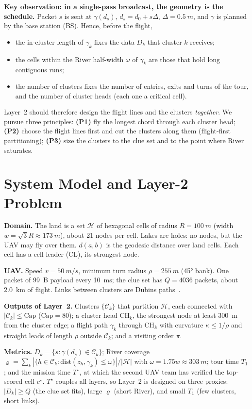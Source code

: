 \documentclass[conference]{IEEEtran}
\newcommand{\CapC}{\mathrm{Cap}}
\newcommand{\CH}{\mathrm{CH}}
\begin{document}
\textbf{Key observation: in a single-pass broadcast, the geometry is the schedule.} Packet $s$ is sent at
$\gamma(d_s)$, $d_s=d_0+s\Delta$, $\Delta=\SI{0.5}{m}$, and $\gamma$ is planned by the base station (BS). Hence,
before the flight,
\begin{itemize}
\item the in-cluster length of $\gamma_k$ fixes the data $D_k$ that cluster $k$ receives;
\item the cells within the River half-width $\omega$ of $\gamma_k$ are those that hold long contiguous runs;
\item the number of clusters fixes the number of entries, exits and turns of the tour, and the number of cluster heads
(each one a critical cell).
\end{itemize}
Layer~2 should therefore design the flight lines and the clusters \emph{together}. We pursue three principles:
\textbf{(P1)} fly the longest chord through each cluster head; \textbf{(P2)} choose the flight lines first and cut
the clusters along them (flight-first partitioning); \textbf{(P3)} size the clusters to the clue set and to the
point where River saturates.

\section{System Model and Layer-2 Problem}
\textbf{Domain.} The land is a set $\mathcal H$ of hexagonal cells of radius $R=\SI{100}{m}$ (width
$w=\sqrt3R\approx\SI{173}{m}$), about 21 nodes per cell. Lakes are holes: no nodes, but the UAV may fly over them.
$d(a,b)$ is the geodesic distance over land cells. Each cell has a cell leader (CL), its strongest node.

\textbf{UAV.} Speed $v=\SI{50}{m/s}$, minimum turn radius $\rho=\SI{255}{m}$ (\ang{45} bank). One packet of
\SI{99}{B} payload every \SI{10}{ms}; the clue set has $Q=4036$ packets, about \SI{2.0}{km} of flight. Links between
clusters are Dubins paths~\cite{dubins1957}.

\textbf{Outputs of Layer~2.} Clusters $\{\mathcal C_k\}$ that partition $\mathcal H$, each connected with
$|\mathcal C_k|\le\CapC$ ($\CapC=80$); a cluster head $\CH_k$, the strongest node at least \SI{300}{m} from the cluster
edge; a flight path $\gamma_k$ through $\CH_k$ with curvature $\kappa\le1/\rho$ and straight leads of length $\rho$
outside $\mathcal C_k$; and a visiting order $\pi$.

\textbf{Metrics.} $D_k=\{s:\gamma(d_s)\in\mathcal C_k\}$; River coverage
$\varrho=\sum_k|\{h\in\mathcal C_k:\mathrm{dist}(z_h,\gamma_k)\le\omega\}|/|\mathcal H|$ with $\omega=1.75w\approx
\SI{303}{m}$; tour time $T_1$; and the mission time $T^\star$, at which the second UAV team has verified the
top-scored cell $c^\star$. $T^\star$ couples all layers, so Layer~2 is designed on three proxies: $|D_k|\ge Q$
(the clue set fits), large $\varrho$ (short River), and small $T_1$ (few clusters, short links).
\end{document}
